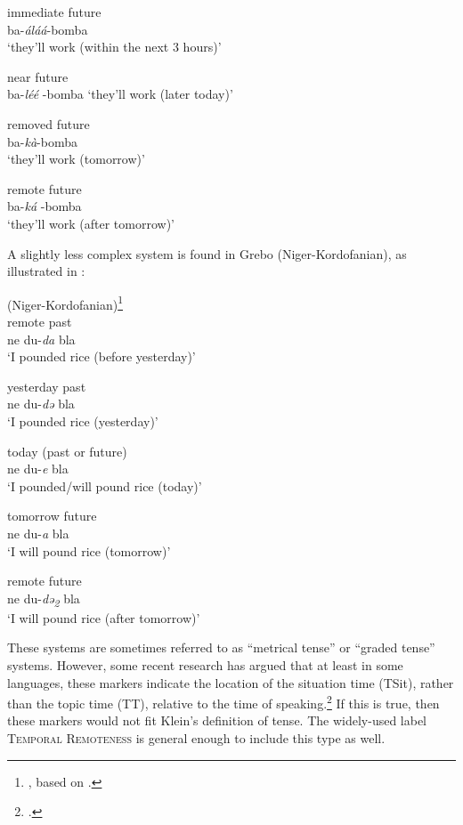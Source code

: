 \ex immediate future   \\
 ba-\textit{áláá}-bomba \\  
\glt‘they’ll work (within the next 3 hours)’

\ex near future  \\
  ba-\textit{léé} -bomba   
\glt‘they’ll work (later today)’

\ex  removed future  \\
 ba-\textit{kà}-bomba  \\ 
\glt‘they’ll work (tomorrow)’

\ex  remote future   \\
ba-\textit{ká} -bomba   \\
\glt ‘they’ll work (after tomorrow)’
\z
\z

A slightly less complex system is found in Grebo (Niger-Kordofanian), as illustrated in :

\ea \label{ex:21.38} 
{ (Niger-Kordofanian)}\footnote{\citet[365–367]{Frawley1992}, based on \citet{Innes1966}.} \\
\ea  remote past \\
ne du-\textit{da} bla \\ 
\glt‘I pounded rice (before yesterday)’

\ex yesterday past\\
ne du-\textit{də} bla\\
\glt ‘I pounded rice (yesterday)’ 

\ex today (past or future) \\
ne du-\textit{e} bla \\ 
\glt‘I pounded/will pound rice (today)’

\ex tomorrow future \\
ne du-\textit{a} bla \\
\glt‘I will pound rice (tomorrow)’

\ex remote future \\
ne du-\textit{də\textsubscript{2}} bla \\ 
\glt‘I will pound rice (after tomorrow)’
\z
\z

\largerpage
These systems are sometimes referred to as “metrical tense” or “graded tense” systems. However, some recent research has argued that at least in some languages, these markers indicate the location of the situation time (TSit), rather than the topic time (TT), relative to the time of speaking.\footnote{\citet{Cable2013,LaCross2016}.} If this is true, then these markers would not fit Klein’s definition of tense. The widely-used label \textsc{Temporal Remoteness} is general enough to include this type as well.



